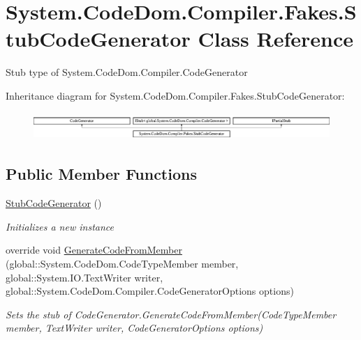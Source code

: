 \hypertarget{class_system_1_1_code_dom_1_1_compiler_1_1_fakes_1_1_stub_code_generator}{\section{System.\-Code\-Dom.\-Compiler.\-Fakes.\-Stub\-Code\-Generator Class Reference}
\label{class_system_1_1_code_dom_1_1_compiler_1_1_fakes_1_1_stub_code_generator}
}


Stub type of System.\-Code\-Dom.\-Compiler.\-Code\-Generator 


Inheritance diagram for System.\-Code\-Dom.\-Compiler.\-Fakes.\-Stub\-Code\-Generator\-:\begin{figure}[H]
\begin{center}
\leavevmode
\includegraphics[height=1.054614cm]{class_system_1_1_code_dom_1_1_compiler_1_1_fakes_1_1_stub_code_generator}
\end{center}
\end{figure}
\subsection*{Public Member Functions}
\begin{DoxyCompactItemize}
\item 
\hyperlink{class_system_1_1_code_dom_1_1_compiler_1_1_fakes_1_1_stub_code_generator_a2c3028a490b8a9d2a37e4ede2cc23418}{Stub\-Code\-Generator} ()
\begin{DoxyCompactList}\small\item\em Initializes a new instance\end{DoxyCompactList}\item 
override void \hyperlink{class_system_1_1_code_dom_1_1_compiler_1_1_fakes_1_1_stub_code_generator_af312ffe2cb1e797d0e79600317b6a613}{Generate\-Code\-From\-Member} (global\-::\-System.\-Code\-Dom.\-Code\-Type\-Member member, global\-::\-System.\-I\-O.\-Text\-Writer writer, global\-::\-System.\-Code\-Dom.\-Compiler.\-Code\-Generator\-Options options)
\begin{DoxyCompactList}\small\item\em Sets the stub of Code\-Generator.\-Generate\-Code\-From\-Member(\-Code\-Type\-Member member, Text\-Writer writer, Code\-Generator\-Options options)\end{DoxyCompactList}\end{DoxyCompactItemize}
